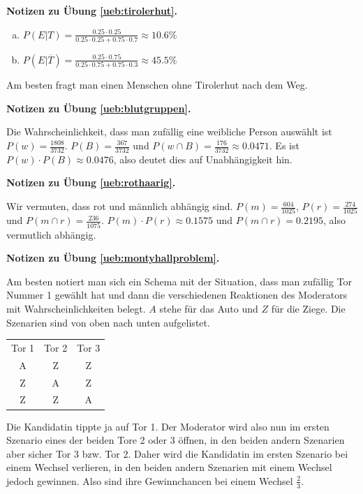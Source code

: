 \documentclass[%
11pt,%
twoside,%
titlepage,%
german,%
headsepline%
]{scrartcl}
\newcommand{\spaltenheight}{\rule{0mm}{3ex}}
\newcommand{\spaltensep}{\\[1ex]}
\newcommand{\concatueb}[1]{ueb:#1}%
\newcommand{\concatlsg}[1]{lsg:#1}%
\newenvironment{lsg}[1]{%
    \par\noindent\textbf{Notizen zu Übung \ref{\concatueb{#1}}.}%
    \label{\concatlsg{#1}}
}{%
    \par%
}
\begin{document}
\begin{lsg}{tirolerhut}
    \begin{enumerate}[a)]
        \item $P(E|T)=\frac{0.25\cdot0.25}{0.25\cdot0.25+0.75\cdot0.7}\approx10.6\%$
        \item $P(E|\overline{T})=\frac{0.25\cdot0.75}{0.25\cdot0.75+0.75\cdot0.3}\approx45.5\%$
    \end{enumerate}
    Am besten fragt man einen Menschen ohne Tirolerhut nach dem Weg.
\end{lsg}
\begin{lsg}{blutgruppen}
    Die Wahrscheinlichkeit, dass man zufällig eine weibliche Person auswählt ist $P(w)=\frac{1808}{3732}$. $P(B)=\frac{367}{3732}$ und $P(w\cap B)=\frac{176}{3732}\approx0.0471$. Es ist $P(w)\cdot P(B)\approx0.0476$, also deutet dies auf Unabhängigkeit hin.
\end{lsg}
\begin{lsg}{rothaarig}
    Wir vermuten, dass rot und männlich abhängig sind. $P(m)=\frac{604}{1025}$, $P(r)=\frac{274}{1025}$ und $P(m\cap r)=\frac{236}{1075}$. $P(m)\cdot P(r)\approx0.1575$ und $P(m\cap r)=0.2195$, also vermutlich abhängig.
\end{lsg}
\begin{lsg}{montyhallproblem}
 Am besten notiert man sich ein Schema mit der Situation, dass man zufällig Tor Nummer 1 gewählt hat und dann die verschiedenen Reaktionen des Moderators mit Wahrscheinlichkeiten belegt. $A$ stehe für das Auto und $Z$ für die Ziege. Die Szenarien sind von oben nach unten aufgelistet.

\begin{table}[h!]
\begin{center}
\begin{tabular}{|c|c|c|}
\hline
\rowcolor{Gray}\spaltenheight Tor 1 & Tor 2 & Tor 3 \spaltensep \hhline{|-|-|-|}
\rowcolor{lightyellow}\spaltenheight  A & Z & Z \spaltensep \hhline{|-|-|-|}
\rowcolor{Gray}\spaltenheight Z & A & Z \spaltensep \hhline{|-|-|-|}
\rowcolor{lightyellow}\spaltenheight  Z & Z & A \spaltensep \hline
\end{tabular}
\end{center}
\end{table}
Die Kandidatin tippte ja auf Tor 1. Der Moderator wird also nun im ersten Szenario eines der beiden Tore 2 oder 3 öffnen, in den beiden andern Szenarien aber sicher Tor 3 bzw. Tor 2. Daher wird die Kandidatin im ersten Szenario bei einem Wechsel verlieren, in den beiden andern Szenarien mit einem Wechsel jedoch gewinnen. Also sind ihre Gewinnchancen bei einem Wechsel $\frac{2}{3}$.
\end{lsg}
\end{document}
